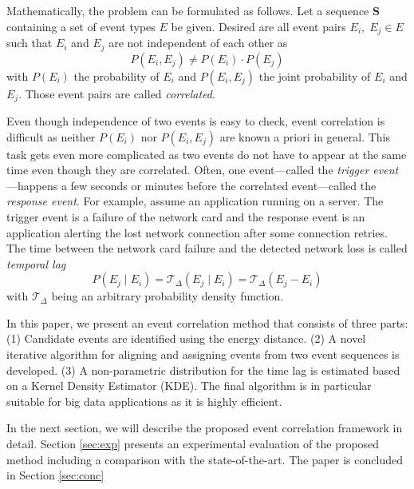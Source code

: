 \documentclass[conference]{IEEEtran}
\theoremstyle{examplestyle}
\begin{document}
Mathematically, the problem can be formulated as follows. Let a sequence \(\pmb{S}\) containing a set of event types \(E\) be given. Desired are all event pairs \(E_i, \; E_j \in E\) such that \(E_i\) and \(E_j\) are not independent of each other as
\begin{equation}
	P(E_i, E_j) \neq P(E_i) \cdot P(E_j)
\end{equation}
with \(P(E_i)\) the probability of \(E_i\) and \(P(E_i, E_j)\) the joint probability of \(E_i\) and \(E_j\). Those event pairs are called \textit{correlated}.

Even though independence of two events is easy to check, event correlation is difficult as neither \(P(E_i)\) nor \(P(E_i, E_j)\) are known a priori in general. This task gets even more complicated as two events do not have to appear at the same time even though they are correlated. Often, one event---called the \textit{trigger event}---happens a few seconds or minutes before the correlated event---called the \textit{response event}. For example, assume an application running on a server. The trigger event is a failure of the network card and the response event is an application alerting the lost network connection after some connection retries. The time between the network card failure and the detected network loss is called \textit{temporal lag}
\begin{equation}
	P(E_j \; | \; E_i) = \mathcal{T}_\Delta (E_j \; | \; E_i) = \mathcal{T}_\Delta (E_j - E_i)
\end{equation}
with \(\mathcal{T}_\Delta\) being an arbitrary probability density function.

In this paper, we present an event correlation method that consists of three parts:
(1) Candidate  events are identified using the energy distance. (2) A novel iterative algorithm for aligning and assigning events from two event sequences is developed. (3) A non-parametric distribution for the time lag is estimated based on a Kernel Density Estimator (KDE).
The final algorithm is in particular suitable for big data applications as it is highly efficient. 

In the next section, we will describe the proposed event correlation framework in detail.
Section \ref{sec:exp} presents an experimental evaluation of the proposed method including a comparison with the state-of-the-art.
The paper is concluded in Section \ref{sec:conc}
\end{document}
